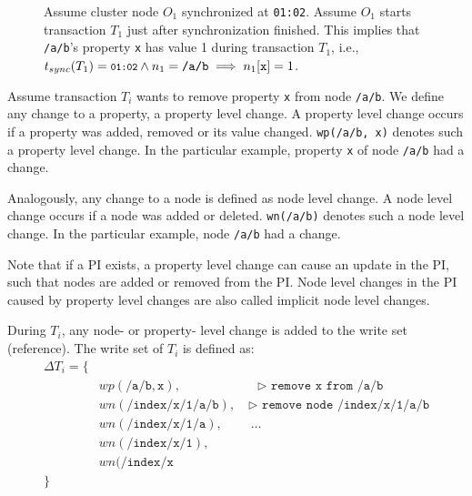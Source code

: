 \documentclass[abstracton,12pt]{scrreprt}
\newenvironment{centerverbatim}{\par\centering\varwidth{\linewidth}\verbatim}
    {\endverbatim\endvarwidth\par}
\begin{document}
\begin{figure}[h]
    \begin{scriptsize}
        \begin{centerverbatim}
[
    { "_id": "0:/", /* ... */ },
    { "_id": "2:/a/b", "x": {
            "r15e830cae80-0-1": 0, /* 01:00 */
            "r15e830d98e0-0-1": 1, /* 01:01 */
            "r15e830f6da0-0-2": 2, /* 01:03 */
        },
        /* ... */
    },
    /* ... */
]
        \end{centerverbatim}
    \end{scriptsize}
    \label{fig:read_example}
    \caption{
        Assume cluster node $O_1$ synchronized at \texttt{01:02}.
        Assume $O_1$ starts transaction $T_1$ just after synchronization finished.
        This implies that \texttt{/a/b}'s property \texttt{x} has value 1 during transaction $T_1$,
        i.e., $ t_{sync}(T_1) = \texttt{\footnotesize01:02} \land n_1 = \texttt{/a/b} \implies n_1[\texttt{x}] = 1$.
    }
\end{figure}

Assume transaction $T_i$ wants to remove property \texttt{x} from node \texttt{/a/b}.
We define any change to a property, a property level change.
A property level change occurs if a property was added, removed or its value changed.
\texttt{wp(/a/b, x)} denotes such a property level change.
In the particular example, property \texttt{x} of node \texttt{/a/b} had a change.

Analogously, any change to a node is defined as node level change.
A node level change occurs if a node was added or deleted.
\texttt{wn(/a/b)} denotes such a node level change.
In the particular example, node \texttt{/a/b} had a change.

Note that if a PI exists, a property level change can cause an update in the PI, such that nodes are added or removed from the PI.
Node level changes in the PI caused by property level changes are also called implicit node level changes.

During $T_i$, any node- or property- level change is added to the write set (reference).
The write set of $T_i$ is defined as:
\begin{equation}
    \begin{split}
\Delta T_i = \{\\
    & wp(\texttt{/a/b}, \texttt{x}), \qquad \qquad \qquad \texttt{$\triangleright$ remove x from /a/b}\\
    & wn(\texttt{/index/x/1/a/b}),\quad \texttt{$\triangleright$ remove node /index/x/1/a/b}\\
    & wn(\texttt{/index/x/1/a}), \qquad \ \dots\\
    & wn(\texttt{/index/x/1}),\\
    & wn(\texttt{/index/x} \\
        \}
    \end{split}
\end{equation}
\end{document}
